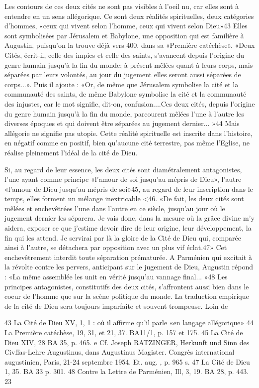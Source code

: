 Les contours de ces deux cités ne sont pas visibles à l'oeil nu, car elles sont à entendre en un sens allégorique. Ce sont deux réalités spirituelles, deux catégories d'hommes, «ceux qui vivent selon l'homme, ceux qui vivent selon Dieu»43  Elles sont symbolisées par Jérusalem et Babylone, une opposition qui est familière à Augustin, puisqu'on la trouve déjà vers 400, dans sa «Première catéchèse». «Deux Cités, écrit-il, celle des impies et celle des saints, s'avancent depuis l'origine du genre humain jusqu'à la fin du monde; à présent mêlées quant à leurs corps, mais séparées par leurs volontés, au jour du jugement elles seront aussi séparées de corps...». Puis il ajoute : «Or, de même que Jérusalem symbolise la cité et la communauté des saints, de même Babylone symbolise la cité et la communauté des injustes, car le mot signifie, dit-on, confusion....Ces deux cités, depuis l'origine du genre humain jusqu'à la fin du monde, parcourent mêlées l'une à l'autre les diverses époques et qui doivent être séparées au jugement dernier... »44  Mais allégorie ne signifie pas utopie. Cette réalité spirituelle est inscrite dans l'histoire, en négatif comme en positif, bien qu'aucune cité terrestre, pas même l'Eglise, ne réalise pleinement l'idéal de la cité de Dieu.

Si, au regard de leur essence, les deux cités sont diamétralement antagonistes, l'une ayant  comme principe «l'amour de soi jusqu'au mépris de Dieu», l'autre
«l'amour de Dieu jusqu'au mépris de soi»45, au regard de leur inscription dans le temps, elles forment un  mélange  inextricable <46. «De fait, les deux cités sont mêlées et enchevêtrées l'une dans l'autre en ce siècle, jusqu'au jour où le jugement dernier les séparera. Je vais donc, dans la mesure où la grâce divine m'y aidera, exposer ce que j'estime devoir dire de leur origine, leur développement, la fin qui les attend. Je servirai par là la gloire de la Cité de Dieu qui, comparée ainsi à l'autre, se détachera par opposition avec un plus vif éclat.47» Cet enchevêtrement interdit toute séparation prématurée. A Parménien qui excitait à la révolte contre les pervers, anticipant sur le jugement de Dieu, Augustin répond : «La même assemblée les unit en vérité jusqu'au vannage final... »48  Les principes antagonistes, constitutifs des deux cités, s'affrontent aussi bien dans le coeur de l'homme que sur la scène politique du monde. La traduction empirique de la cité de Dieu sera toujours imparfaite et souvent trompeuse. Loin de

43 La Cité de Dieu XV, 1, 1 : où il affirme qu'il parle «en langage allégorique»
44 La Première catéchèse, 19, 31, et 21, 37. BA11/1, p. 157 et 175.
45 La Cité de Dieu XIV, 28 BA 35, p. 465.
 e Cf. Joseph RATZINGER, Herkunft und Sinn des Civffas-Lehre Augustinus, dans Augustinus Magister. Congrès international augustinien, Paris, 21-24 septembre 1954. Et. aug. , p. 965 s.
47 La Cité de Dieu 1, 35. BA 33 p. 301.
48 Contre la Lettre de Parménien, Ill, 3, 19. BA 28, p. 443.
23
 
